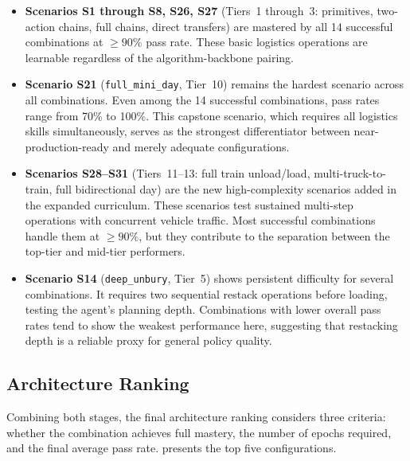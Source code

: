 \begin{itemize}
  \item \textbf{Scenarios S1 through S8, S26, S27} (Tiers~1 through~3: primitives, two-action chains, full chains, direct transfers) are mastered by all 14 successful combinations at $\geq 90\%$ pass rate. These basic logistics operations are learnable regardless of the algorithm-backbone pairing.

  \item \textbf{Scenario S21} (\texttt{full\_mini\_day}, Tier~10) remains the hardest scenario across all combinations. Even among the 14 successful combinations, pass rates range from 70\% to 100\%. This capstone scenario, which requires all logistics skills simultaneously, serves as the strongest differentiator between near-production-ready and merely adequate configurations.

  \item \textbf{Scenarios S28--S31} (Tiers~11--13: full train unload/load, multi-truck-to-train, full bidirectional day) are the new high-complexity scenarios added in the expanded curriculum. These scenarios test sustained multi-step operations with concurrent vehicle traffic. Most successful combinations handle them at $\geq 90\%$, but they contribute to the separation between the top-tier and mid-tier performers.

  \item \textbf{Scenario S14} (\texttt{deep\_unbury}, Tier~5) shows persistent difficulty for several combinations. It requires two sequential restack operations before loading, testing the agent's planning depth. Combinations with lower overall pass rates tend to show the weakest performance here, suggesting that restacking depth is a reliable proxy for general policy quality.
\end{itemize}

\subsection{Architecture Ranking}
\label{sec:res:phase1:ranking}

Combining both stages, the final architecture ranking considers three criteria: whether the combination achieves full mastery, the number of epochs required, and the final average pass rate.  presents the top five configurations.


